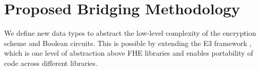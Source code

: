 \section{Proposed Bridging Methodology}\label{s:bridging}

We define new data types to abstract the low-level complexity of the encryption scheme and Boolean circuits.
This is possible by extending the  E3 framework \cite{e3eprint}, which is one level of abstraction above FHE libraries and enables portability of code across different libraries.


% 